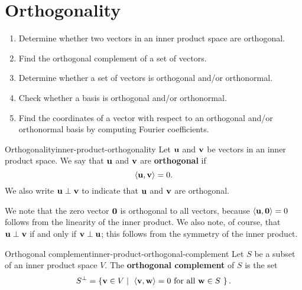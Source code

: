 \section{Orthogonality}

\begin{outcome}
  \begin{enumerate}
  \item Determine whether two vectors in an inner product space are
    orthogonal.
  \item Find the orthogonal complement of a set of vectors.
  \item Determine whether a set of vectors is orthogonal and/or orthonormal.
  \item Check whether a basis is orthogonal and/or orthonormal.
  \item Find the coordinates of a vector with respect to an orthogonal
    and/or orthonormal basis by computing Fourier coefficients.
  \end{enumerate}
\end{outcome}

\begin{definition}{Orthogonality}{inner-product-orthogonality}
  Let $\vect{u}$ and $\vect{v}$ be vectors in an inner product space.
  We say that $\vect{u}$ and $\vect{v}$ are \textbf{orthogonal}%
   if
  \begin{equation*}
    \iprod{\vect{u}, \vect{v}} = 0.
  \end{equation*}
  We also write $\vect{u}\orth\vect{v}$ to indicate that $\vect{u}$
  and $\vect{v}$ are orthogonal.
\end{definition}

We note that the zero vector $\vect{0}$ is orthogonal to all vectors,
because $\iprod{\vect{u},\vect{0}} = 0$ follows from the linearity of
the inner product. We also note, of course, that
$\vect{u}\orth\vect{v}$ if and only if $\vect{v}\orth\vect{u}$; this
follows from the symmetry of the inner product.

\begin{definition}{Orthogonal complement}{inner-product-orthogonal-complement}
  Let $S$ be a subset of an inner product space $V$. The
  \textbf{orthogonal complement}%
   of $S$ is the set
  \begin{equation*}
    S^{\orth} = \set{\vect{v}\in V \mid
      \mbox{
        $\iprod{\vect{v},\vect{w}} = 0$ for all $\vect{w}\in S$
      }}.
  \end{equation*}
\end{definition}

